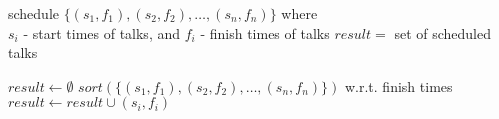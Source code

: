   \REQUIRE schedule $\{(s_1, f_1), (s_2, f_2),\ldots, (s_n, f_n)\}$ where \\ $s_i$ - start times of talks, and $f_i$ - finish times of talks            
  \ENSURE $result = $ set of scheduled talks

  \STATE $result \leftarrow \emptyset$
  \STATE $sort(\{(s_1, f_1), (s_2, f_2),\ldots, (s_n, f_n)\})$ w.r.t. finish times   
      \STATE $result \leftarrow  result \cup (s_i, f_i)$
      \ENDIF
  \ENDFOR
